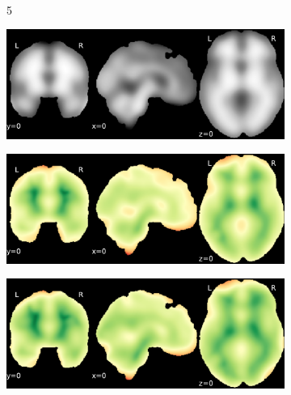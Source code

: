 \documentclass{article}
\begin{document}
\begin{appendices}
\begin{landscape}
\begin{figure}
\begin{subfigure}[t]{0.2\paperheight}
            \end{subfigure} \\
            \begin{subfigure}[b][][c]{0.01\paperwidth} 5 \vspace*{15pt} \end{subfigure}
            \begin{subfigure}[t]{0.2\paperheight}
                \centering
                \includegraphics[width=\textwidth]{figures/sig/20mm/ieee_ds001748_sub-adult15.pdf}
            \end{subfigure}
            \begin{subfigure}[t]{0.2\paperheight}
                \centering
                \includegraphics[width=\textwidth]{figures/sig/20mm/rr_ds001748_sub-adult15_sig.pdf}
            \end{subfigure}
            \begin{subfigure}[t]{0.2\paperheight}
                \centering
                \includegraphics[width=\textwidth]{figures/sig/20mm/rs_ds001748_sub-adult15_sig.pdf}

\end{subfigure}
\end{figure}
\end{landscape}
\end{appendices}
\end{document}
